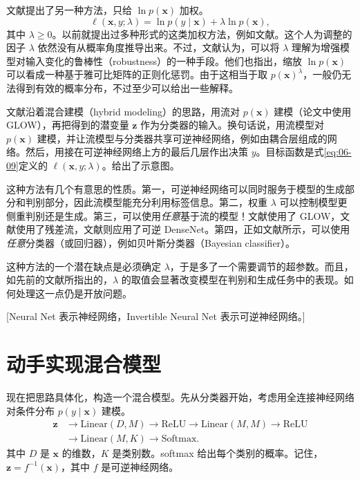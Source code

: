 文献提出了另一种方法，只给 $\ln p(\mathbf{x})$ 加权。
\begin{equation}
\ell(\mathbf{x},y;\lambda)=\ln p(y\mid\mathbf{x})+\lambda\ln p(\mathbf{x}),
\tag{6.9}\label{eq:06-09}
\end{equation}
其中 $\lambda\ge 0$。以前就提出过多种形式的这类加权方法，例如文献。这个人为调整的因子 $\lambda$ 依然没有从概率角度推导出来。不过，文献认为，可以将 $\lambda$ 理解为增强模型对输入变化的鲁棒性（robustness）的一种手段。他们也指出，缩放 $\ln p(\mathbf{x})$ 可以看成一种基于雅可比矩阵的正则化惩罚。由于这相当于取 $p(\mathbf{x})^\lambda$，一般仍无法得到有效的概率分布，不过至少可以给出一些解释。

文献沿着混合建模（hybrid modeling）的思路，用流对 $p(\mathbf{x})$ 建模（论文中使用 GLOW），再把得到的潜变量 $\mathbf{z}$ 作为分类器的输入。换句话说，用流模型对 $p(\mathbf{x})$ 建模，并让流模型与分类器共享可逆神经网络，例如由耦合层组成的网络。然后，用接在可逆神经网络上方的最后几层作出决策 $y$。目标函数是式\eqref{eq:06-09}定义的 $\ell(\mathbf{x},y;\lambda)$。给出了示意图。

这种方法有几个有意思的性质。第一，可逆神经网络可以同时服务于模型的生成部分和判别部分，因此流模型能充分利用标签信息。第二，权重 $\lambda$ 可以控制模型更侧重判别还是生成。第三，可以使用\emph{任意}基于流的模型！文献使用了 GLOW，文献使用了残差流，文献则应用了可逆 DenseNet。第四，正如文献所示，可以使用\emph{任意}分类器（或回归器），例如贝叶斯分类器（Bayesian classifier）。

这种方法的一个潜在缺点是必须确定 $\lambda$，于是多了一个需要调节的超参数。而且，如先前的文献所指出的，$\lambda$ 的取值会显著改变模型在判别和生成任务中的表现。如何处理这一点仍是开放问题。

[Neural Net 表示神经网络，Invertible Neural Net 表示可逆神经网络。]

\section{动手实现混合模型}

现在把思路具体化，构造一个混合模型。先从分类器开始，考虑用全连接神经网络对条件分布 $p(y\mid\mathbf{x})$ 建模。
\[
\begin{aligned}
\mathbf{z}&\to\mathrm{Linear}(D,M)\to\mathrm{ReLU}\to\mathrm{Linear}(M,M)\to\mathrm{ReLU}\\
&\to\mathrm{Linear}(M,K)\to\mathrm{Softmax}.
\end{aligned}
\]
其中 $D$ 是 $\mathbf{x}$ 的维数，$K$ 是类别数。softmax 给出每个类别的概率。记住，$\mathbf{z}=f^{-1}(\mathbf{x})$，其中 $f$ 是可逆神经网络。

